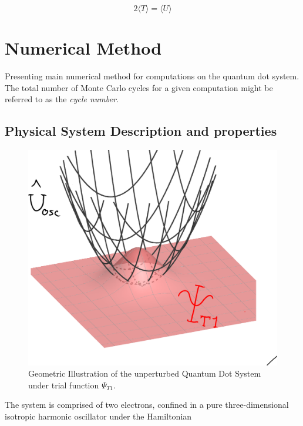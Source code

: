 \documentclass[aip,nobalancelastpage,
twocolumn,
rsi,%
 amsmath,amssymb,
 reprint,%
]{revtex4}
\begin{document}
\begin{equation}
2\langle T\rangle = \langle U \rangle
\end{equation}

\section{Numerical Method}
Presenting main numerical method for computations on the quantum dot system. The total number of Monte Carlo cycles for a given computation might be referred to as the \textit{cycle number}.

\subsection{\label{sec:theoryPhyssyst}Physical System Description and properties}
\begin{figure}[H]
\center
\caption{Geometric Illustration of the unperturbed Quantum Dot System under trial function $\Psi_{T1}$.}
\includegraphics[scale=0.4]{probDist.png}
\end{figure}

The system is comprised of two electrons, confined in a pure three-dimensional isotropic harmonic oscillator
under the Hamiltonian
\end{document}
